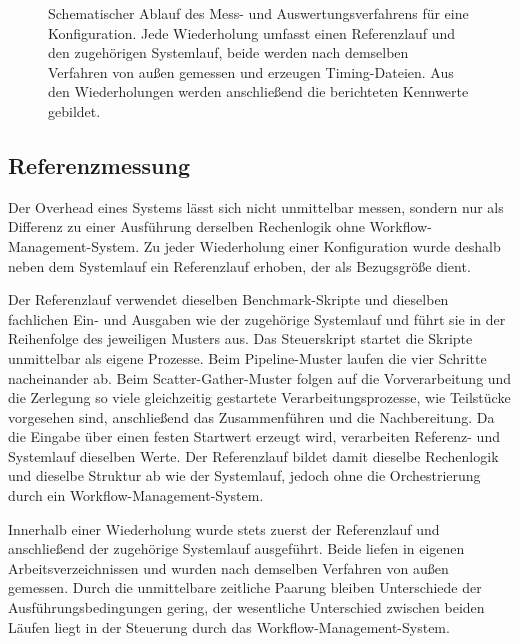 \begin{figure}[H]
  \caption{Schematischer Ablauf des Mess- und Auswertungsverfahrens für eine Konfiguration. Jede Wiederholung umfasst einen Referenzlauf und den zugehörigen Systemlauf, beide werden nach demselben Verfahren von außen gemessen und erzeugen Timing-Dateien. Aus den Wiederholungen werden anschließend die berichteten Kennwerte gebildet.}
  \label{fig:methodik:messung}
\end{figure}

\subsection{Referenzmessung}
\label{sec:methodik:referenz}

Der Overhead eines Systems lässt sich nicht unmittelbar messen,
sondern nur als Differenz zu einer Ausführung derselben Rechenlogik
ohne Workflow-Management-System. Zu jeder Wiederholung einer
Konfiguration wurde deshalb neben dem Systemlauf ein Referenzlauf
erhoben, der als Bezugsgröße dient.

Der Referenzlauf verwendet dieselben Benchmark-Skripte und dieselben
fachlichen Ein- und Ausgaben wie der zugehörige Systemlauf und führt
sie in der Reihenfolge des jeweiligen Musters aus. Das Steuerskript
startet die Skripte unmittelbar als eigene Prozesse. Beim Pipeline-Muster
laufen die vier Schritte nacheinander ab. Beim
Scatter-Gather-Muster folgen auf die Vorverarbeitung und die
Zerlegung so viele gleichzeitig gestartete Verarbeitungsprozesse,
wie Teilstücke vorgesehen sind, anschließend das Zusammenführen und
die Nachbereitung. Da die Eingabe über einen festen Startwert
erzeugt wird, verarbeiten Referenz- und Systemlauf dieselben Werte.
Der Referenzlauf bildet damit dieselbe Rechenlogik und dieselbe
Struktur ab wie der Systemlauf, jedoch ohne die Orchestrierung durch ein Workflow-Management-System.

Innerhalb einer Wiederholung wurde stets zuerst der Referenzlauf
und anschließend der zugehörige Systemlauf ausgeführt. Beide liefen
in eigenen Arbeitsverzeichnissen und wurden nach demselben
Verfahren von außen gemessen. Durch die unmittelbare zeitliche
Paarung bleiben Unterschiede der Ausführungsbedingungen gering, der
wesentliche Unterschied zwischen beiden Läufen liegt in der
Steuerung durch das Workflow-Management-System.


